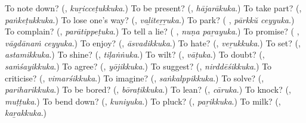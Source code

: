 \begin{tcolorbox}[breakable,colback=teal!4,colframe=teal!35!black,title={Before you move on}]
To note down? (\textbf{}, \emph{kuṟicceṭukkuka}.) To be present? (\textbf{}, \emph{hājarākuka}.) To take part? (\textbf{}, \emph{paṅkeṭukkuka}.) To lose one's way? (\textbf{}, \emph{vaḻiteṟṟuka}.) To park? (\textbf{ }, \emph{pārkkŭ ceyyuka}.) To complain? (\textbf{}, \emph{parātippeṭuka}.) To tell a lie? (\textbf{ }, \emph{nuṇa paṟayuka}.) To promise? (\textbf{ }, \emph{vāgdānaṁ ceyyuka}.) To enjoy? (\textbf{}, \emph{āsvadikkuka}.) To hate? (\textbf{}, \emph{veṟukkuka}.) To set? (\textbf{}, \emph{astamikkuka}.) To shine? (\textbf{}, \emph{tiḷaṅṅuka}.) To wilt? (\textbf{}, \emph{vāṭuka}.) To doubt? (\textbf{}, \emph{saṁśayikkuka}.) To agree? (\textbf{}, \emph{yōjikkuka}.) To suggest? (\textbf{}, \emph{nirddēśikkuka}.) To criticise? (\textbf{}, \emph{vimarśikkuka}.) To imagine? (\textbf{}, \emph{saṅkalppikkuka}.) To solve? (\textbf{}, \emph{pariharikkuka}.) To be bored? (\textbf{}, \emph{bōraṭikkuka}.) To lean? (\textbf{}, \emph{cāruka}.) To knock? (\textbf{}, \emph{muṭṭuka}.) To bend down? (\textbf{}, \emph{kuniyuka}.) To pluck? (\textbf{}, \emph{paṟikkuka}.) To milk? (\textbf{}, \emph{kaṟakkuka}.)
\end{tcolorbox}

